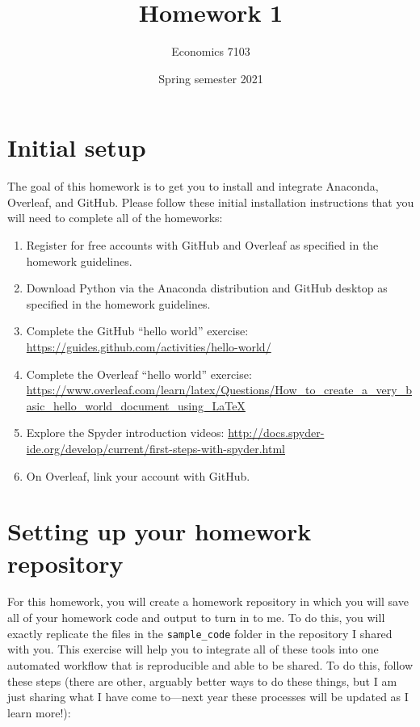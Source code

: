 \documentclass{article}
\title{Homework 1}
\author{Economics 7103}
\date{Spring semester 2021}
\begin{document}
  
\maketitle

\section*{Initial setup}
\noindent The goal of this homework is to get you to install and integrate Anaconda, Overleaf, and GitHub.  Please follow these initial installation instructions that you will need to complete all of the homeworks:
\begin{enumerate}
    \item Register for free accounts with GitHub and Overleaf as specified in the homework guidelines.
    \item Download Python via the Anaconda distribution and GitHub desktop as specified in the homework guidelines.
    \item Complete the GitHub ``hello world'' exercise: \url{https://guides.github.com/activities/hello-world/}
    \item Complete the Overleaf ``hello world'' exercise: \url{https://www.overleaf.com/learn/latex/Questions/How_to_create_a_very_basic_hello_world_document_using_LaTeX}
    \item Explore the Spyder introduction videos: \url{http://docs.spyder-ide.org/develop/current/first-steps-with-spyder.html}
    \item On Overleaf, link your account with GitHub.
\end{enumerate}

\section*{Setting up your homework repository}

For this homework, you will create a homework repository in which you will save all of your homework code and output to turn in to me.  To do this, you will exactly replicate the files in the \verb!sample_code! folder in the repository I shared with you.  This exercise will help you to integrate all of these tools into one automated workflow that is reproducible and able to be shared.  To do this, follow these steps (there are other, arguably better ways to do these things, but I am just sharing what I have come to---next year these processes will be updated as I learn more!):
\end{document}
